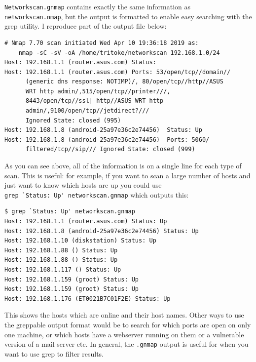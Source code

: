 \documentclass[titlepage]{article}
\begin{document}
\verb|Networkscan.gnmap| contains exactly the same information as \\
\verb|networkscan.nmap|,
but the output is formatted to enable easy searching with the grep utility.
I reproduce part of the output file below:
\begin{verbatim}
# Nmap 7.70 scan initiated Wed Apr 10 19:36:18 2019 as:
    nmap -sC -sV -oA /home/tritoke/networkscan 192.168.1.0/24
Host: 192.168.1.1 (router.asus.com) Status:
Host: 192.168.1.1 (router.asus.com) Ports: 53/open/tcp//domain//
      (generic dns response: NOTIMP)/, 80/open/tcp//http//ASUS
      WRT http admin/,515/open/tcp//printer///,
      8443/open/tcp//ssl| http//ASUS WRT http
      admin/,9100/open/tcp//jetdirect?///
      Ignored State: closed (995)
Host: 192.168.1.8 (android-25a97e36c2e74456)  Status: Up
Host: 192.168.1.8 (android-25a97e36c2e74456)  Ports: 5060/
      filtered/tcp//sip/// Ignored State: closed (999)
\end{verbatim}
As you can see above, all of the information is on a single line for each type of scan.
This is useful: for example, if you want to scan a large number of hosts and just want
to know which hosts are up you could use \\
\verb|grep `Status: Up' networkscan.gnmap|
which outputs this:
\begin{verbatim}
$ grep `Status: Up' networkscan.gnmap
Host: 192.168.1.1 (router.asus.com) Status: Up
Host: 192.168.1.8 (android-25a97e36c2e74456) Status: Up
Host: 192.168.1.10 (diskstation) Status: Up
Host: 192.168.1.88 () Status: Up
Host: 192.168.1.88 () Status: Up
Host: 192.168.1.117 () Status: Up
Host: 192.168.1.159 (groot) Status: Up
Host: 192.168.1.159 (groot) Status: Up
Host: 192.168.1.176 (ET0021B7C01F2E) Status: Up
\end{verbatim}
This shows the hosts which are online and their host names. Other ways to use the greppable
output format would be to search for which ports are open on only one machine, or which hosts have a
webserver running on them or a vulnerable version of a mail server etc. In general, the \verb|.gnmap|
output is useful for when you want to use grep to filter results.
\end{document}
